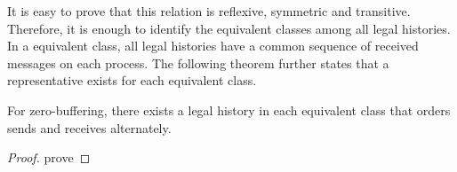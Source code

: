 It is easy to prove that this relation is reflexive, symmetric and transitive. Therefore, it is enough to identify the equivalent classes among all legal histories. In a equivalent class, all legal histories have a common sequence of received messages on each process. The following theorem further states that a representative exists for each equivalent class. 

\begin{theorem}
For zero-buffering, there exists a legal history in each equivalent class that orders sends and receives alternately.
\end{theorem}

\begin{proof}
prove 
\end{proof}



 



